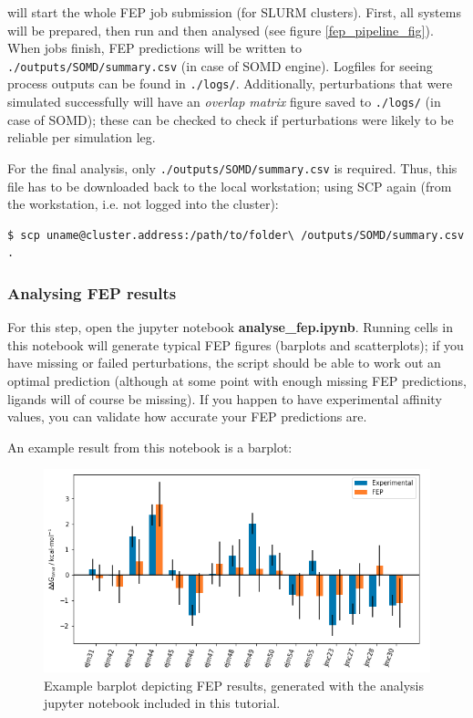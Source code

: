 will start the whole FEP job submission (for SLURM clusters). First, all systems will be
prepared, then run and then analysed (see figure \ref{fep_pipeline_fig}). When jobs finish, FEP predictions will be written to \texttt{./outputs/SOMD/summary.csv} (in case of SOMD
engine). Logfiles for seeing process outputs can be found in
\texttt{./logs/}. Additionally, perturbations that were simulated
successfully will have an \emph{overlap matrix} figure saved to
\texttt{./logs/} (in case of SOMD); these can be checked to check if perturbations were likely to be reliable per simulation leg. \cite{mey2020best}

For the final analysis, only \texttt{./outputs/SOMD/summary.csv} is required. Thus, this file has to be downloaded back to the local workstation; using SCP again (from the workstation, i.e. not logged into the cluster):

\begin{lstlisting}
$ scp uname@cluster.address:/path/to/folder\ /outputs/SOMD/summary.csv .
\end{lstlisting}


\subsubsection{Analysing FEP results}

For this step, open the jupyter notebook \textbf{analyse\_fep.ipynb}.
Running cells in this notebook will generate typical FEP figures
(barplots and scatterplots); if you have missing or failed
perturbations, the script should be able to work out an optimal
prediction (although at some point with enough missing FEP predictions,
ligands will of course be missing). If you happen to have experimental
affinity values, you can validate how accurate your FEP predictions are.

An example result from this notebook is a barplot:

\begin{figure}[htp]
\includegraphics[width=\linewidth]{04_fep/inputs/tut_imgs/fep_barplot.png}
\caption{Example barplot depicting FEP results, generated with the analysis jupyter notebook included in this tutorial.}
\label{fep_barplot_fig}
\end{figure}




